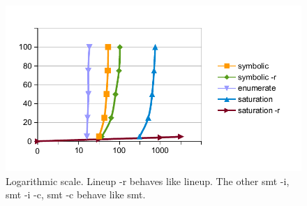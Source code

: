 \begin{figure}[t]
  \centering
  \includegraphics[width=\linewidth]{figures/new_chart}
  \caption{Logarithmic scale. Lineup -r behaves like lineup. The other smt -i, smt -i -c, smt -c behave like smt.
  }
  \label{fig:data:chart}
\end{figure}






